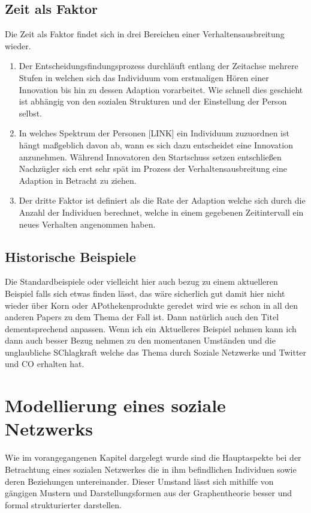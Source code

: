 \documentclass[12pt]{article}
\begin{document}
\subsection{Zeit als Faktor}
Die Zeit als Faktor findet sich in drei Bereichen einer Verhaltensausbreitung wieder.
\begin{enumerate}
\item Der Entscheidungsfindungsprozess durchläuft entlang der Zeitachse mehrere Stufen in welchen sich das Individuum vom erstmaligen Hören einer Innovation bis hin zu dessen Adaption vorarbeitet. Wie schnell dies geschieht ist abhängig von den sozialen Strukturen und der Einstellung der Person selbst.
\item In welches Spektrum der Personen [LINK] ein Individuum zuzuordnen ist hängt maßgeblich davon ab, wann es sich dazu entscheidet eine Innovation anzunehmen. Während Innovatoren den Startschuss setzen entschließen Nachzügler sich erst sehr spät im Prozess der Verhaltensausbreitung eine Adaption in Betracht zu ziehen.
\item Der dritte Faktor ist definiert als die Rate der Adaption welche sich durch die Anzahl der Individuen berechnet, welche in einem gegebenen Zeitintervall ein neues Verhalten angenommen haben.
\end{enumerate}

\subsection{Historische Beispiele}
Die Standardbeispiele oder vielleicht hier auch bezug zu einem aktuelleren Beispiel falls sich etwas finden lässt, das wäre sicherlich gut damit hier nicht wieder über Korn oder APothekenprodukte geredet wird wie es schon in all den anderen Papers zu dem Thema der Fall ist. Dann natürlich auch den Titel dementsprechend anpassen. Wenn ich ein Aktuelleres Beispiel nehmen kann ich dann auch besser Bezug nehmen zu den momentanen Umständen und die unglaubliche SChlagkraft welche das Thema durch Soziale Netzwerke und Twitter und CO erhalten hat.

\section{Modellierung eines soziale Netzwerks}
Wie im vorangegangenen Kapitel dargelegt wurde sind die Hauptaspekte bei der Betrachtung eines sozialen Netzwerkes die in ihm befindlichen Individuen sowie deren Beziehungen untereinander. Dieser Umstand lässt sich mithilfe von gängigen Mustern und Darstellungsformen aus der Graphentheorie besser und formal strukturierter darstellen.\\\\
\end{document}

